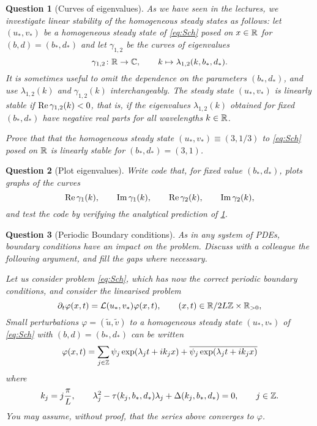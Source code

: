 \documentclass[a4paper]{siamart220329}
\theoremstyle{plain}
\newtheorem{question}{Question}
\renewcommand{\phi}{\varphi}
\begin{document}
\begin{question}[Curves of eigenvalues] \label{question:lambdaCurves}
  As we have seen in the lectures, we
  investigate linear stability of the homogeneous steady states as follows: let
  $(u_*,v_*)$ be a homogeneous steady state of \cref{eq:Sch} posed on $x \in \mathbb{R}$ for $(b,d) = (b_*,d_*)$ and
  let $\gamma_{1,2}$ be the curves of eigenvalues
  \[
    \gamma_{1,2} \colon \mathbb{R} \to \mathbb{C}, \qquad k \mapsto \lambda_{1,2}(k,b_*,d_*).
  \] 
  It is sometimes useful to omit the dependence on the parameters $(b_*,d_*)$, and
  use $\lambda_{1,2}(k)$ and $\gamma_{1,2}(k)$ interchangeably. The steady state
  $(u_*,v_*)$ is linearly stable if  $\operatorname{Re} \gamma_{1,2}(k) <0$, that is, if the
  eigenvalues $\lambda_{1,2}(k)$ obtained for fixed $(b_*,d_*)$ have negative real
  parts for all wavelengths $k \in \mathbb{R}$.

  Prove that that the homogeneous steady state $(u_*, v_*) \equiv (3,1/3)$ to
  \cref{eq:Sch} posed on $\mathbb{R}$ is linearly stable for $(b_*,d_*) = (3,1)$.

\end{question}
\begin{question}[Plot eigenvalues]\label{ques:plot} 
  Write code that, for fixed value $(b_*,d_*)$, plots graphs of the curves
  \[
  \operatorname{Re} \gamma_1(k), \qquad \operatorname{Im} \gamma_1(k), \qquad \operatorname{Re} \gamma_2(k), \qquad \operatorname{Im}
  \gamma_2(k),
  \] 
  and test the code by verifying the analytical prediction of
  \cref{question:lambdaCurves}.
\end{question}

\begin{question}[Periodic Boundary conditions] 
  As in any system of PDEs, boundary conditions have an impact on the problem.
  Discuss with a colleague the following argument, and fill the gaps where necessary.

  Let us consider problem \cref{eq:Sch}, which has now the correct periodic boundary
  conditions, and consider the linearised problem
  \begin{equation}\label{eq:linearBCs}
    \partial_t \phi(x,t) = \calL(u_*,v_*) \phi(x,t), \qquad
	(x,t) \in \RSet/ 2L \ZSet \times \RSet_{>0}, 
  \end{equation} 
  Small perturbations $\phi = (\tilde u, \tilde v)$ to a homogeneous
  steady state $(u_*,v_*)$ of \cref{eq:Sch} with $(b,d) = (b_*,d_*)$ can be written
  \[
    \phi(x,t) = \sum_{j \in \ZSet}  \psi_j \exp (\lambda_{j} t + i k_j x) +
    \overline{\psi_j \exp (\lambda_j t + i k_j x)}
  \]
  where
  \[
  k_j = j \frac{\pi}{L}, \qquad \lambda_j^2 - \tau(k_j,b_*,d_*) \lambda_j +
  \Delta(k_j,b_*,d_*) = 0, \qquad j \in \mathbb{Z}.
\] 
You may assume, without proof, that the series above converges to $\phi$.
\end{question}
\end{document}

